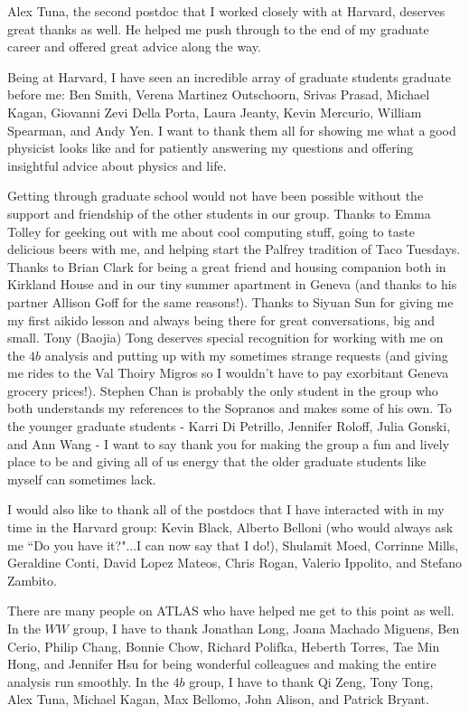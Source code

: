 Alex Tuna, the second postdoc that I worked closely with at Harvard, deserves great thanks as well. He helped me push through to the end of my graduate career and offered great advice along the way. 

Being at Harvard, I have seen an incredible array of graduate students graduate before me: Ben Smith, Verena Martinez Outschoorn, Srivas Prasad, Michael Kagan, Giovanni Zevi Della Porta, Laura Jeanty, Kevin Mercurio, William Spearman, and Andy Yen. I want to thank them all for showing me what a good physicist looks like and for patiently answering my questions and offering insightful advice about physics and life. 

Getting through graduate school would not have been possible without the support and friendship of the other students in our group. Thanks to Emma Tolley for geeking out with me about cool computing stuff, going to taste delicious beers with me, and helping start the Palfrey tradition of Taco Tuesdays. Thanks to Brian Clark for being a great friend and housing companion both in Kirkland House and in our tiny summer apartment in Geneva (and thanks to his partner Allison Goff for the same reasons!). Thanks to Siyuan Sun for giving me my first aikido lesson and always being there for great conversations, big and small. Tony (Baojia) Tong deserves special recognition for working with me on the $4b$ analysis and putting up with my sometimes strange requests (and giving me rides to the Val Thoiry Migros so I wouldn't have to pay exorbitant Geneva grocery prices!). Stephen Chan is probably the only student in the group who both understands my references to the Sopranos and makes some of his own. To the younger graduate students - Karri Di Petrillo, Jennifer Roloff, Julia Gonski, and Ann Wang - I want to say thank you for making the group a fun and lively place to be and giving all of us energy that the older graduate students like myself can sometimes lack. 

I would also like to thank all of the postdocs that I have interacted with in my time in the Harvard group: Kevin Black, Alberto Belloni (who would always ask me ``Do you have it?"...I can now say that I do!), Shulamit Moed, Corrinne Mills, Geraldine Conti, David Lopez Mateos, Chris Rogan, Valerio Ippolito, and Stefano Zambito. 

There are many people on ATLAS who have helped me get to this point as well. In the $WW$ group, I have to thank Jonathan Long, Joana Machado Miguens, Ben Cerio, Philip Chang, Bonnie Chow, Richard Polifka, Heberth Torres, Tae Min Hong, and Jennifer Hsu for being wonderful colleagues and making the entire analysis run smoothly. In the $4b$ group, I have to thank Qi Zeng, Tony Tong, Alex Tuna, Michael Kagan, Max Bellomo, John Alison, and Patrick Bryant. 

